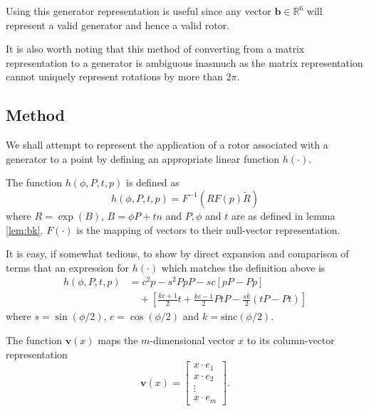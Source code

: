 Using this generator representation is useful since any vector
$\mathbf{b} \in {\mathbb R}^6$ will represent a valid generator and
hence a valid rotor.


It is also worth noting that this method of converting from a matrix
representation to a generator is ambiguous inasmuch as the matrix representation
cannot uniquely represent rotations by more than $2\pi$.

\subsection{Method}

We shall attempt to represent the application of a rotor associated
with a generator to a point by defining an appropriate linear function
$h(\cdot)$.

\begin{definition}
The function $h(\phi, P, t, p)$ is defined as
\[
h(\phi, P, t, p) = F^{-1} \left( R F(p) \tilde{R} \right)
\]
where $R = \exp(B)$, $B = \phi P+tn$ and $P, \phi$ and $t$ are
as defined in lemma \ref{lem:bk}. $F(\cdot)$ is the 
mapping of vectors to their null-vector representation.
\end{definition}

It is easy, if somewhat tedious, to show by direct expansion and comparison of terms that
an expression for $h(\cdot)$ which matches the definition above is
\begin{align}
h(\phi, P, t, p) &=c^2p - s^2PpP - sc\left[pP - Pp\right] \nonumber \\
&\quad+ \left[ 
 \frac{kc+1}{2} t + \frac{kc-1}{2} PtP
- \frac{sk}{2} (tP - Pt)
\right] \label{eqn:defn}
\end{align}
where $s = \sin(\phi/2)$, $c = \cos(\phi/2)$ and $k = \textrm{sinc}(\phi/2)$.

\begin{definition}
The function $\mathbf{v}(x)$ maps the $m$-dimensional vector $x$ to its column-vector
representation
\[
\mathbf{v}(x) = \left[
\begin{array}{c}
x \cdot e_1 \\ x \cdot e_2 \\ \vdots \\ x \cdot e_m
\end{array} 
\right].
\]
\end{definition}

